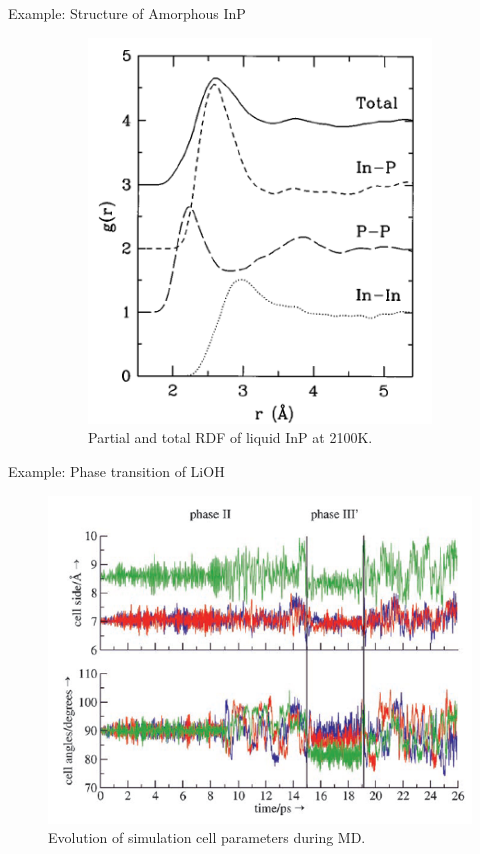 \documentclass[aspectratio=169]{beamer}
\begin{document}
\begin{frame}{Example: Structure of Amorphous InP}
\begin{figure}
\begin{subfigure}{0.3\textwidth}
    \end{subfigure}
        \begin{subfigure}{0.3\textwidth}
        \centering
        \includegraphics[width=\linewidth]{lectures/figures/13-InP_3.png}
    \caption{Partial and total RDF of liquid InP at 2100K.}
    \end{subfigure}
    \caption{\cite{lewisStructureElectronicProperties1998}}
    \label{fig}
\end{figure} 
\end{frame} 

\begin{frame}{Example: Phase transition of LiOH}
\begin{figure}
    \centering
    \includegraphics[width=0.5\linewidth]{lectures/figures/13-LiOH.png}
    \caption{Evolution of simulation cell parameters during MD.\cite{pagliaiLithiumHydroxidePhase2006}}
\end{figure} 
\end{frame} 
\end{document}
